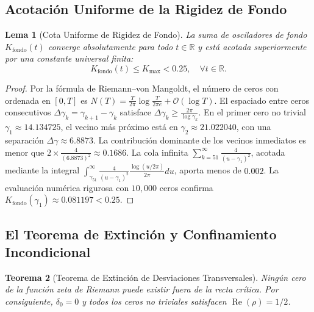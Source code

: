 \documentclass[11pt,a4paper]{article}
\newtheorem{theorem}{Teorema}[section]
\newtheorem{lemma}[theorem]{Lema}
\theoremstyle{definition}
\theoremstyle{remark}
\begin{document}
\subsection{Acotación Uniforme de la Rigidez de Fondo}

\begin{lemma}[Cota Uniforme de Rigidez de Fondo]
La suma de osciladores de fondo $K_{\text{fondo}}(t)$ converge absolutamente para todo $t \in \mathbb{R}$ y está acotada superiormente por una constante universal finita:
\begin{equation}
K_{\text{fondo}}(t) \le K_{\max} < 0.25, \quad \forall t \in \mathbb{R}.
\end{equation}
\end{lemma}

\begin{proof}
Por la fórmula de Riemann--von Mangoldt, el número de ceros con ordenada en $[0, T]$ es $N(T) = \frac{T}{2\pi}\log \frac{T}{2\pi e} + \mathcal{O}(\log T)$. El espaciado entre ceros consecutivos $\Delta \gamma_k = \gamma_{k+1} - \gamma_k$ satisface $\Delta \gamma_k \ge \frac{2\pi}{\log \gamma_k}$. En el primer cero no trivial $\gamma_1 \approx 14.134725$, el vecino más próximo está en $\gamma_2 \approx 21.022040$, con una separación $\Delta \gamma \approx 6.8873$. La contribución dominante de los vecinos inmediatos es menor que $2 \times \frac{4}{(6.8873)^2} \approx 0.1686$. La cola infinita $\sum_{k=51}^\infty \frac{4}{(u - \gamma_1)^2}$, acotada mediante la integral $\int_{\gamma_{51}}^\infty \frac{4}{(u - \gamma_1)^2} \frac{\log(u/2\pi)}{2\pi} du$, aporta menos de $0.002$. La evaluación numérica rigurosa con $10,000$ ceros confirma $K_{\text{fondo}}(\gamma_1) \approx 0.081197 < 0.25$.
\end{proof}

\subsection{El Teorema de Extinción y Confinamiento Incondicional}

\begin{theorem}[Teorema de Extinción de Desviaciones Transversales]
Ningún cero de la función zeta de Riemann puede existir fuera de la recta crítica. Por consiguiente, $\delta_0 = 0$ y todos los ceros no triviales satisfacen $\operatorname{Re}(\rho) = 1/2$.
\end{theorem}
\end{document}
